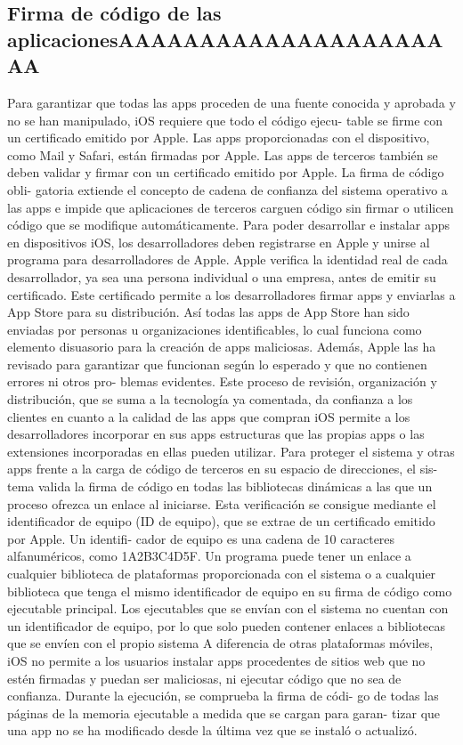 \subsection{Firma de código de las aplicacionesAAAAAAAAAAAAAAAAAAAAAA}
Para garantizar que todas las apps proceden de una fuente 
conocida y aprobada y no se han manipulado, iOS requiere que todo el código ejecu-
table se firme con un certificado emitido por Apple. Las apps proporcionadas con el 
dispositivo, como Mail y Safari, están firmadas por Apple. Las apps de terceros también 
se deben validar y firmar con un certificado emitido por Apple. La firma de código obli-
gatoria extiende el concepto de cadena de confianza del sistema operativo a las apps 
e impide que aplicaciones de terceros carguen código sin firmar o utilicen código que 
se modifique automáticamente.
Para poder desarrollar e instalar apps en dispositivos iOS, los desarrolladores deben 
registrarse en Apple y unirse al programa para desarrolladores de Apple. Apple verifica 
la identidad real de cada desarrollador, ya sea una persona individual o una empresa, 
antes de emitir su certificado. Este certificado permite a los desarrolladores firmar apps 
y enviarlas a App Store para su distribución. Así todas las apps de App Store han sido 
enviadas por personas u organizaciones identificables, lo cual funciona como elemento 
disuasorio para la creación de apps maliciosas. Además, Apple las ha revisado para 
garantizar que funcionan según lo esperado y que no contienen errores ni otros pro-
blemas evidentes. Este proceso de revisión, organización y distribución, que se suma 
a la tecnología ya comentada, da confianza a los clientes en cuanto a la calidad de las 
apps que compran
iOS permite a los desarrolladores incorporar en sus apps estructuras que las propias 
apps o las extensiones incorporadas en ellas pueden utilizar. Para proteger el sistema y 
otras apps frente a la carga de código de terceros en su espacio de direcciones, el sis-
tema valida la firma de código en todas las bibliotecas dinámicas a las que un proceso 
ofrezca un enlace al iniciarse. Esta verificación se consigue mediante el identificador de 
equipo (ID de equipo), que se extrae de un certificado emitido por Apple. Un identifi-
cador de equipo es una cadena de 10 caracteres alfanuméricos, como 1A2B3C4D5F.
 Un 
programa puede tener un enlace a cualquier biblioteca de plataformas proporcionada 
con el sistema o a cualquier biblioteca que tenga el mismo identificador de equipo 
en su firma de código como ejecutable principal. Los ejecutables que se envían con el 
sistema no cuentan con un identificador de equipo, por lo que solo pueden contener 
enlaces a bibliotecas que se envíen con el propio sistema
A diferencia de otras plataformas móviles, iOS no permite a los usuarios instalar apps 
procedentes de sitios web que no estén firmadas y puedan ser maliciosas, ni ejecutar 
código que no sea de confianza. Durante la ejecución, se comprueba la firma de códi-
go de todas las páginas de la memoria ejecutable a medida que se cargan para garan-
tizar que una app no se ha modificado desde la última vez que se instaló o actualizó.
